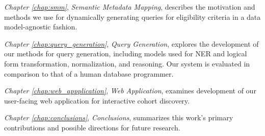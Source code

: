\documentclass[../main.tex]{subfiles}
\begin{document}
\textit{Chapter \ref{chap:smm}}, \textit{Semantic Metadata Mapping}, describes the motivation and methods we use for dynamically generating queries for eligibility criteria in a data model-agnostic fashion.

\textit{Chapter \ref{chap:query_generation}}, \textit{Query Generation}, explores the development of our methods for query generation, including models used for NER and logical form transformation, normalization, and reasoning. Our system is evaluated in comparison to that of a human database programmer.

\textit{Chapter \ref{chap:web_appplication}}, \textit{Web Application}, examines development of our user-facing web application for interactive cohort discovery.

\textit{Chapter \ref{chap:conclusions}}, \textit{Conclusions}, summarizes this work's primary contributions and possible directions for future research.
\end{document}
